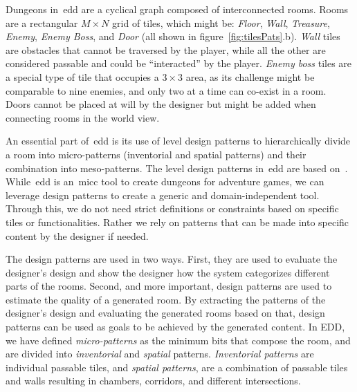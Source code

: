 Dungeons in~\acrshort{edd} are a cyclical graph composed of interconnected rooms. Rooms are a rectangular $M \times N$ grid of tiles, which might be: \emph{Floor}, \emph{Wall}, \emph{Treasure}, \emph{Enemy}, \emph{Enemy Boss}, and \emph{Door} (all shown in figure~\ref{fig:tilesPats}.b). \emph{Wall} tiles are obstacles that cannot be traversed by the player, while all the other are considered passable and could be ``interacted'' by the player. \emph{Enemy boss} tiles are a special type of tile that occupies a $3\times3$ area, as its challenge might be comparable to nine enemies, and only two at a time can co-exist in a room. Doors cannot be placed at will by the designer but might be added when connecting rooms in the world view. 


An essential part of~\acrshort{edd} is its use of level design patterns to hierarchically divide a room into micro-patterns (inventorial and spatial patterns) and their combination into meso-patterns. The level design patterns in~\acrshort{edd} are based on~\cite{bjork_patterns_2004,dahlskog_patterns_2015,dahlskog_procedural_2014}. While~\acrshort{edd} is an~\acrshort{micc} tool to create dungeons for adventure games, we can leverage design patterns to create a generic and domain-independent tool. Through this, we do not need strict definitions or constraints based on specific tiles or functionalities. Rather we rely on patterns that can be made into specific content by the designer if needed.

The design patterns are used in two ways. First, they are used to evaluate the designer's design and show the designer how the system categorizes different parts of the rooms. Second, and more important, design patterns are used to estimate the quality of a generated room. By extracting the patterns of the designer's design and evaluating the generated rooms based on that, design patterns can be used as goals to be achieved by the generated content. In EDD, we have defined \emph{micro-patterns} as the minimum bits that compose the room, and are divided into \emph{inventorial} and \emph{spatial} patterns. \emph{Inventorial patterns} are individual passable tiles, and \emph{spatial patterns}, are a combination of passable tiles and walls resulting in chambers, corridors, and different intersections. 

